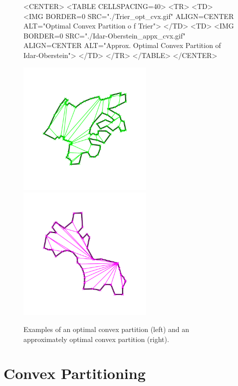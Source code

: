 \begin{figure}
\begin{ccHtmlOnly}
<CENTER>
<TABLE CELLSPACING=40>
<TR>
<TD>
<IMG BORDER=0 SRC="./Trier_opt_cvx.gif" ALIGN=CENTER ALT="Optimal Convex Partition o
f Trier">
</TD>
<TD>
<IMG BORDER=0 SRC="./Idar-Oberstein_appx_cvx.gif" ALIGN=CENTER ALT="Approx. Optimal
Convex Partition of Idar-Oberstein">
</TD>
</TR>
</TABLE>
</CENTER>
\end{ccHtmlOnly}

\begin{ccTexOnly}
\begin{center}
\includegraphics[width=6.5cm]{Partition_2/Trier_opt_cvx}
\includegraphics[width=6.5cm]{Partition_2/Idar-Oberstein_appx_cvx}
\end{center}
\end{ccTexOnly}
\caption{Examples of an optimal convex partition (left) and an approximately
optimal convex partition (right).}
\end{figure}


\section{Convex Partitioning\label{sec:partition_2_convex}}



